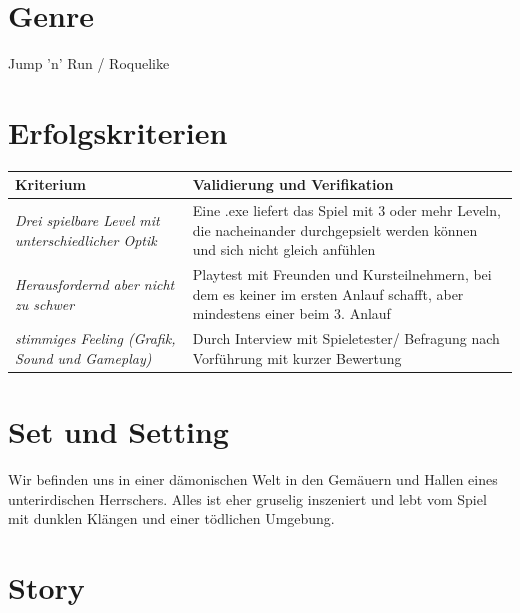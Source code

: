 \documentclass{article}
\begin{document}


	

\newpage
\section{Genre}

Jump 'n' Run / Roquelike

\vspace{1cm}
\section{Erfolgskriterien}

   \begin{table}[H]
	\centering
	\begin{tabular}{p{4cm}p{7cm}}
		\textbf{Kriterium}  & \textbf{Validierung und Verifikation} \\
		\hline
		\textit{Drei spielbare Level mit unterschiedlicher Optik}          & \textnormal{Eine .exe liefert das Spiel mit 3 oder mehr Leveln, die nacheinander durchgepsielt werden können und sich nicht gleich anfühlen}            \\
		\hline
		\textit{Herausfordernd aber nicht zu schwer}       & \textnormal{Playtest mit Freunden und Kursteilnehmern, bei dem es keiner im ersten Anlauf schafft, aber mindestens einer beim 3. Anlauf} \\
		\hline
		\textit{stimmiges Feeling (Grafik, Sound und Gameplay)}        & \textnormal{Durch Interview mit Spieletester/ Befragung nach Vorführung mit kurzer Bewertung} \\
	\end{tabular}	
	\label{tbl:ktierien}
	
\end{table}


\vspace{1cm}
\section{Set und Setting}

Wir befinden uns in einer dämonischen Welt in den Gemäuern und Hallen eines unterirdischen Herrschers. Alles ist eher gruselig inszeniert und lebt vom Spiel mit dunklen Klängen und einer tödlichen Umgebung.

\vspace{1cm}
\section{Story}
\end{document}
